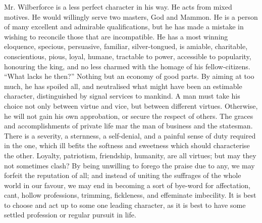 Mr. Wilberforce is a less perfect character in his way. He acts
from mixed motives. He would willingly serve two masters, God and
Mammon. He is a person of many excellent and admirable
qualifications, but he has made a mistake in wishing to reconcile
those that are incompatible.  He has a most winning eloquence,
specious, persuasive, familiar, silver-tongued, is amiable,
charitable, conscientious, pious, loyal, humane, tractable to
power, accessible to popularity, honouring the king, and no less
charmed with the homage of his fellow-citizens. ``What lacks he
then?'' Nothing but an economy of good parts. By aiming at too
much, he has spoiled all, and neutralised what might have been an
estimable character, distinguished by signal services to
mankind. A man must take his choice not only between virtue and
vice, but between different virtues. Otherwise, he will not gain
his own approbation, or secure the respect of others. The graces
and accomplishments of private life mar the man of business and
the statesman. There is a severity, a sternness, a self-denial,
and a painful sense of duty required in the one, which ill befits
the softness and sweetness which should characterise the
other. Loyalty, patriotism, friendship, humanity, are all virtues;
but may they not sometimes clash? By being unwilling to forego the
praise due to any, we may forfeit the reputation of all; and
instead of uniting the suffrages of the whole world in our favour,
we may end in becoming a sort of bye-word for affectation, cant,
hollow professions, trimming, fickleness, and effeminate
imbecility. It is best to choose and act up to some one leading
character, as it is best to have some settled profession or
regular pursuit in life.

